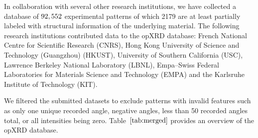 In collaboration with several other research institutions, we have collected a database of $92,552$ experimental patterns of which 2179 are at least partially labeled with structural information of the underlying material. The following research institutions contributed data to the opXRD database: French National Centre for Scientific Research (CNRS), Hong Kong University of Science and Technology (Guangzhou) (HKUST), University of Southern California (USC), Lawrence Berkeley National Laboratory (LBNL), Empa–Swiss Federal Laboratories for Materials Science and Technology (EMPA) and the Karlsruhe Institute of Technology (KIT). \newline

We filtered the submitted datasets to exclude patterns with invalid features such as only one unique recorded angle, negative angles, less than 50 recorded angles total, or all intensities being zero. Table~$\eqref{tab:merged}$ provides an overview of the opXRD database. 

\begin{table}[!htb]
\centering
\caption{\footnotesize Overview of the contributions to the opXRD database: The availability of the chemical composition, spacegroups, lattice parameters, and atomic coordinates of the underlying samples are indicated by the columns ``Comp.'', ``Spg.'', ``Lattice'' and ``Atom coords.'' respectively.}
\label{tab:merged}
\end{table}

